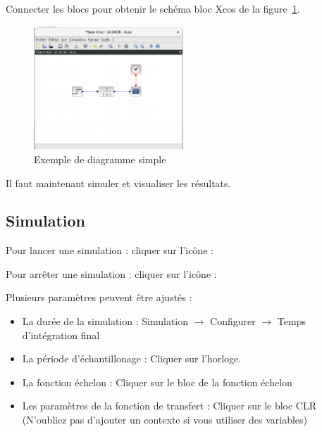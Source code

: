 Connecter les blocs pour obtenir le schéma bloc Xcos de la figure~\ref{fig-simple}.

\begin{figure}
    \centering
    \includegraphics[width=0.5\textwidth]{fig/diagramme_simple.eps}
    \caption{Exemple de diagramme simple\label{fig-simple}}
\end{figure}

Il faut maintenant simuler et visualiser les résultats.  

\subsection{Simulation}

Pour lancer une simulation : cliquer sur l'icône : 

Pour arrêter une simulation : cliquer sur l'icône : 

Plusieurs paramètres peuvent être ajustés :
\begin{itemize}
    \item La durée de la simulation : Simulation $\rightarrow$ Configurer $\rightarrow$ Temps d'intégration final
    \item La période d'échantillonage : Cliquer sur l'horloge.
    \item La fonction échelon  : Cliquer sur le bloc de la fonction échelon
    \item Les paramètres de la fonction de transfert : Cliquer sur le bloc CLR 
        (N'oubliez pas d'ajouter un contexte si vous utiliser des variables)
\end{itemize}


